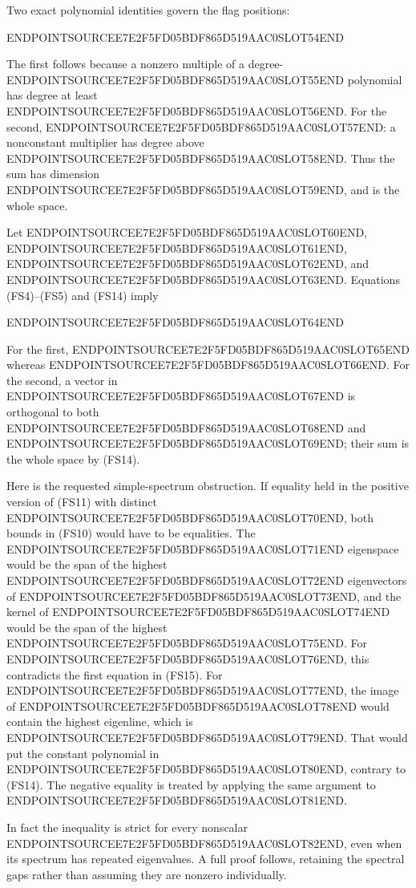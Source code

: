 Two exact polynomial identities govern the flag positions:

ENDPOINTSOURCEE7E2F5FD05BDF865D519AAC0SLOT54END

The first follows because a nonzero multiple of a degree-ENDPOINTSOURCEE7E2F5FD05BDF865D519AAC0SLOT55END polynomial has degree at least ENDPOINTSOURCEE7E2F5FD05BDF865D519AAC0SLOT56END. For the second, ENDPOINTSOURCEE7E2F5FD05BDF865D519AAC0SLOT57END: a nonconstant multiplier has degree above ENDPOINTSOURCEE7E2F5FD05BDF865D519AAC0SLOT58END. Thus the sum has dimension ENDPOINTSOURCEE7E2F5FD05BDF865D519AAC0SLOT59END, and is the whole space.

Let ENDPOINTSOURCEE7E2F5FD05BDF865D519AAC0SLOT60END, ENDPOINTSOURCEE7E2F5FD05BDF865D519AAC0SLOT61END, ENDPOINTSOURCEE7E2F5FD05BDF865D519AAC0SLOT62END, and ENDPOINTSOURCEE7E2F5FD05BDF865D519AAC0SLOT63END. Equations (FS4)--(FS5) and (FS14) imply

ENDPOINTSOURCEE7E2F5FD05BDF865D519AAC0SLOT64END

For the first, ENDPOINTSOURCEE7E2F5FD05BDF865D519AAC0SLOT65END whereas ENDPOINTSOURCEE7E2F5FD05BDF865D519AAC0SLOT66END. For the second, a vector in ENDPOINTSOURCEE7E2F5FD05BDF865D519AAC0SLOT67END is orthogonal to both ENDPOINTSOURCEE7E2F5FD05BDF865D519AAC0SLOT68END and ENDPOINTSOURCEE7E2F5FD05BDF865D519AAC0SLOT69END; their sum is the whole space by (FS14).

Here is the requested simple-spectrum obstruction. If equality held in the positive version of (FS11) with distinct ENDPOINTSOURCEE7E2F5FD05BDF865D519AAC0SLOT70END, both bounds in (FS10) would have to be equalities. The ENDPOINTSOURCEE7E2F5FD05BDF865D519AAC0SLOT71END eigenspace would be the span of the highest ENDPOINTSOURCEE7E2F5FD05BDF865D519AAC0SLOT72END eigenvectors of ENDPOINTSOURCEE7E2F5FD05BDF865D519AAC0SLOT73END, and the kernel of ENDPOINTSOURCEE7E2F5FD05BDF865D519AAC0SLOT74END would be the span of the highest ENDPOINTSOURCEE7E2F5FD05BDF865D519AAC0SLOT75END. For ENDPOINTSOURCEE7E2F5FD05BDF865D519AAC0SLOT76END, this contradicts the first equation in (FS15). For ENDPOINTSOURCEE7E2F5FD05BDF865D519AAC0SLOT77END, the image of ENDPOINTSOURCEE7E2F5FD05BDF865D519AAC0SLOT78END would contain the highest eigenline, which is ENDPOINTSOURCEE7E2F5FD05BDF865D519AAC0SLOT79END. That would put the constant polynomial in ENDPOINTSOURCEE7E2F5FD05BDF865D519AAC0SLOT80END, contrary to (FS14). The negative equality is treated by applying the same argument to ENDPOINTSOURCEE7E2F5FD05BDF865D519AAC0SLOT81END.

In fact the inequality is strict for every nonscalar ENDPOINTSOURCEE7E2F5FD05BDF865D519AAC0SLOT82END, even when its spectrum has repeated eigenvalues. A full proof follows, retaining the spectral gaps rather than assuming they are nonzero individually.

